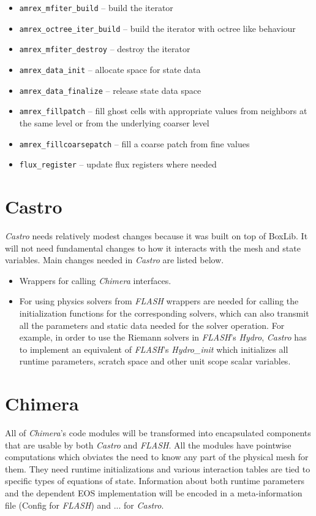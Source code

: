 \documentclass{article}
\newcommand{\code}[1]{{\tt#1}}
\newcommand{\flash}{{\it FLASH}\xspace}
\newcommand{\castro}{{\it Castro}\xspace}
\newcommand{\chimera}{{\it Chimera}\xspace}
\begin{document}
\begin{itemize}
\item \code{amrex\_mfiter\_build} -- build the iterator 
\item \code{amrex\_octree\_iter\_build} -- build the iterator with octree like behaviour
\item \code{amrex\_mfiter\_destroy} -- destroy the iterator
\item \code{amrex\_data\_init} -- allocate space for state data
\item \code{amrex\_data\_finalize} -- release state data space
\item \code{amrex\_fillpatch} -- fill ghost cells with appropriate values
  from neighbors at the same level or from the underlying coarser
  level
\item \code{amrex\_fillcoarsepatch} -- fill a coarse patch from fine values
\item \code{flux\_register} -- update flux registers where needed
\end{itemize}


\section{Castro}
\label{sec:castro}
\castro needs relatively modest changes because it was built on top
of BoxLib. It will not need fundamental
changes to how it interacts with the mesh and state variables. Main
changes needed in \castro are listed below.
\begin{itemize}
\item Wrappers for calling \chimera  interfaces.
\item For using physics solvers from \flash wrappers are needed for
calling the initialization functions for the corresponding solvers,
which can also transmit all the parameters and static data needed for
the solver operation. For example, in order to use the Riemann solvers
in \flash's {\it Hydro}, \castro has to implement an equivalent of
\flash's {\it Hydro\_init} which initializes all runtime parameters, 
scratch space and other unit scope scalar variables.
\end{itemize}

\section{Chimera}
All of \chimera's code modules will be transformed into encapsulated
components that are usable by both \castro and \flash. All the modules
have pointwise computations which obviates the need to know any part of
the physical mesh for them. They need runtime initializations and
various interaction tables are tied to specific types of equations of
state. Information about both runtime parameters and the dependent EOS
implementation will be encoded in a meta-information file (Config for
\flash) and ... for \castro.
\end{document}
